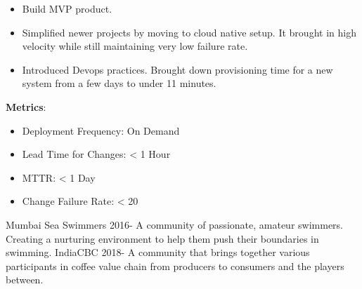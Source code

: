 \documentclass[11pt]{spidercv}
\begin{document}
\begin{MainPart}
{            \begin{DoubleColumns}
	            \begin{itemize}
	            \item[\ding{51}]Build MVP product.\\ 
            	\item[\ding{51}]Simplified newer projects by moving to cloud native setup. It brought in high velocity while still maintaining very low failure rate.\\
            	\item[\ding{51}]Introduced Devops practices. Brought down provisioning time for a new system from a few days to under 11 minutes.
            	\end{itemize}
            \nextcolumn
            	\textbf{Metrics}: \\
            		\begin{itemize}
	            		\item Deployment Frequency: On Demand \\
            			\item Lead Time for Changes: < 1 Hour \\
            		    \item MTTR: < 1 Day \\
            			\item Change Failure Rate: < 20%
	            	\end{itemize}
    		\end{DoubleColumns}
        }

    
    \Experience
        {\ColorHighlight}
		{Mumbai Sea Swimmers}
		{}
		{2016-\faUndo}
        {   
            A community of passionate, amateur swimmers. Creating a nurturing environment to help them push their boundaries in swimming. 
        }
	\Experience
        {\ColorHighlight}
		{IndiaCBC}
		{}
		{2018-\faUndo}
        {   
            A community that brings together various participants in coffee value chain from producers to consumers and the players between.
        }
        
    \end{MainPart}

\newpage

	\begin{TopBar}{\ColorTextSide}
	\end{TopBar}
	
\end{document}
